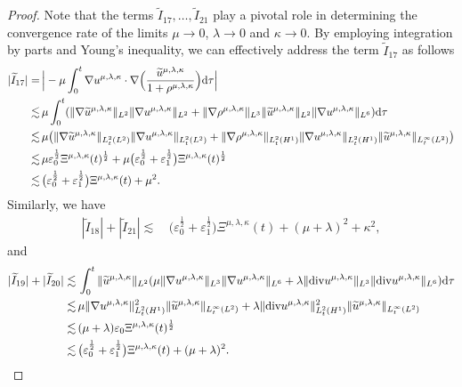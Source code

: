 \documentclass[reqno,11pt]{amsart}
\theoremstyle{plain}
\numberwithin{equation}{section}
\newcommand{\eps}{{\varepsilon}}
\begin{document}
\begin{proof}
 Note that the terms $\widetilde{I}_{17},\dots,\widetilde{I}_{21} $ play  a pivotal role in determining the convergence rate of the limits $\mu\rightarrow0$, $\lambda\rightarrow0$ and $\kappa\rightarrow 0$.  By employing integration by parts and Young's inequality, we can effectively address the term $\widetilde{I}_{17}$ as follows
\begin{align}\label{LNXG4.18}
|\widetilde{I}_{17}|=&\,\Big| -\mu\int_0^t \nabla u^{\mu,\lambda,\kappa}\cdot\nabla\Big(\frac{\widetilde{u}^{{\mu,\lambda,\kappa}}}{1+\rho^{{\mu,\lambda,\kappa}}}\Big)  {\rm d}\tau\Big|\nonumber\\ 
\lesssim&\, \mu \int_0^t(\|\nabla\widetilde{u}^{\mu,\lambda,\kappa}\|_{ L^2}\|\nabla {u}^{\mu,\lambda,\kappa}\|_{L^2} + \|\nabla\rho^{\mu,\lambda,\kappa}\|_{L^3}\|\widetilde{u}^{\mu,\lambda,\kappa}\|_{L^2}\|\nabla u^{\mu,\lambda,\kappa}\|_{L^6}){\rm d}\tau\nonumber\\
\lesssim&\, \mu\big( \|\nabla\widetilde{u}^{\mu,\lambda,\kappa}\|_{L_t^2(L^2)}   \|\nabla {u}^{{\mu,\lambda,\kappa}}\|_{L_t^2(L^2)}+  \|\nabla\rho^{{\mu,\lambda,\kappa}}\|_{L_t^2(H^1)}\|\nabla u^{{\mu,\lambda,\kappa}}\|_{L_t^2(H^1)}\|\widetilde{u}^{{\mu,\lambda,\kappa}}\|_{L_t^{\infty}(L^2)}\big)\nonumber\\
\lesssim& \,\mu  \eps_0^\frac{1}{2}  {\Xi} ^{\mu,\lambda,\kappa}(t)^{\frac{1}{2}}+\mu \big(\eps_0^\frac{1}{2} +\eps_1^\frac{1}{2}\big)  {\Xi} ^{\mu,\lambda,\kappa}(t)^{\frac{1}{2}}\nonumber\\
\lesssim&\,\big(\eps_0^\frac{1}{2}+\eps_1^\frac{1}{2}\big){\Xi} ^{\mu,\lambda,\kappa}(t)+ \mu^2.  
\end{align}
Similarly, we have
\begin{align}\label{LNXG4.14}
|\widetilde{I}_{18}|+|\widetilde{I}_{21}|
\lesssim&\,\big(\eps_0^\frac{1}{2}+\eps_1^\frac{1}{2}\big){\Xi} ^{\mu,\lambda,\kappa}(t)+ (\mu+\lambda)^2+\kappa^2,
\end{align}
and
\begin{align}\label{LNXG4.20}
|\widetilde{I}_{19}|+|\widetilde{I}_{20}|\lesssim&\,  \int_0^t \|\widetilde{u}^{\mu,\lambda,\kappa}\|_{L^2}(\mu\|\nabla u^{\mu,\lambda,\kappa}\|_{L^3}\|\nabla u^{\mu,\lambda,\kappa}\|_{L^6}+\lambda\|{\rm div} u^{\mu,\lambda,\kappa}\|_{L^3}\|{\rm div} u^{\mu,\lambda,\kappa}\|_{L^6}){\rm d}\tau\nonumber\\ 
\lesssim&\,\mu\|\nabla u^{\mu,\lambda,\kappa}\|_{L_t^2(H^1)}^2\|\widetilde{u}^{\mu,\lambda,\kappa}\|_{L_t^\infty(L^2)}+\lambda\| {\rm div}u^{\mu,\lambda,\kappa}\|_{L_t^2(H^1)}^2\|\widetilde{u}^{\mu,\lambda,\kappa}\|_{L_t^\infty(L^2)} \nonumber\\
\lesssim&\, (\mu+\lambda)\eps_0{\Xi} ^{\mu,\lambda,\kappa}(t)^{\frac{1}{2}} \nonumber\\
\lesssim&\, \big(\eps_0^\frac{1}{2}+\eps_1^\frac{1}{2}\big){\Xi} ^{\mu,\lambda,\kappa}(t)+ (\mu+\lambda)^2.
\end{align} 




\end{proof}
\end{document}
